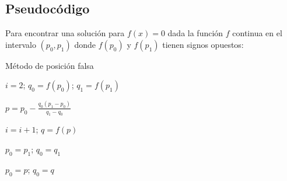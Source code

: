 \subsection{Pseudocódigo}

Para encontrar una solución para $ f(x) = 0 $ dada la función $ f $ continua en el intervalo $ (p_0, p_1) $ donde $ f(p_0) $ y $ f(p_1) $ tienen signos opuestos:

\begin{algorithm}
    \caption{Método de posición falsa}
    
    $ i = 2 $; $ q_0 = f(p_0) $; $ q_1 = f(p_1) $
    
    \BlankLine
    
     {
        $ p = p_0 - \frac{q_0 (p_1 - p_0)}{q_1 - q_0} $
        
        \BlankLine
        
         {
            }
        
        \BlankLine
        
        $ i = i + 1 $; $ q = f(p) $
        \BlankLine
        
         {
                $ p_0 = p_1 $; $ q_0 = q_1 $
            }
            
        \BlankLine
        
        $ p_0 = p $; $ q_0 = q $
    }
    
\end{algorithm}